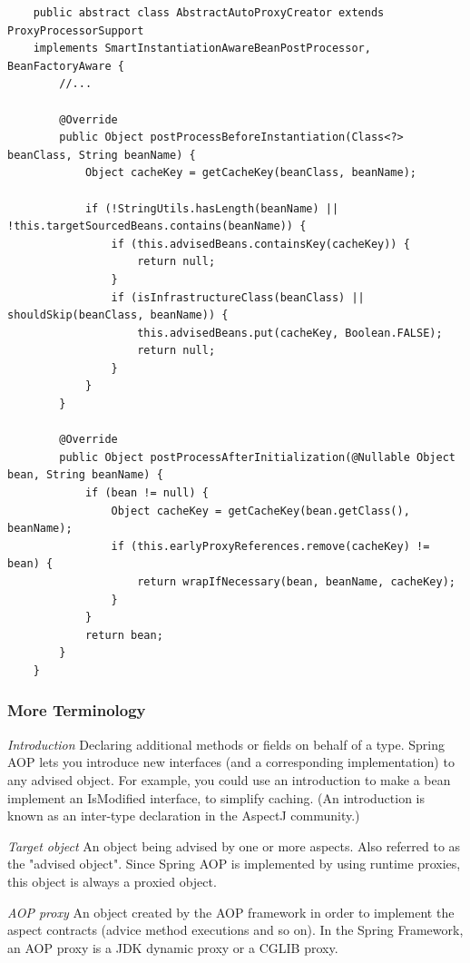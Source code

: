 \documentclass{scrartcl}
\begin{document}
\begin{lstlisting}
    public abstract class AbstractAutoProxyCreator extends ProxyProcessorSupport
    implements SmartInstantiationAwareBeanPostProcessor, BeanFactoryAware {
        //...

        @Override
        public Object postProcessBeforeInstantiation(Class<?> beanClass, String beanName) {
            Object cacheKey = getCacheKey(beanClass, beanName);

            if (!StringUtils.hasLength(beanName) || !this.targetSourcedBeans.contains(beanName)) {
                if (this.advisedBeans.containsKey(cacheKey)) {
                    return null;
                }
                if (isInfrastructureClass(beanClass) || shouldSkip(beanClass, beanName)) {
                    this.advisedBeans.put(cacheKey, Boolean.FALSE);
                    return null;
                }
            }
        }

        @Override
        public Object postProcessAfterInitialization(@Nullable Object bean, String beanName) {
            if (bean != null) {
                Object cacheKey = getCacheKey(bean.getClass(), beanName);
                if (this.earlyProxyReferences.remove(cacheKey) != bean) {
                    return wrapIfNecessary(bean, beanName, cacheKey);
                }
            }
            return bean;
        }
    }
\end{lstlisting}

\subsubsection{More Terminology}

\textit{Introduction}
Declaring additional methods or fields on behalf of a type. Spring AOP lets you introduce new interfaces (and a corresponding implementation) to any advised object. For example, you could use an introduction to make a bean implement an IsModified interface, to simplify caching. (An introduction is known as an inter-type declaration in the AspectJ community.)

\textit{Target object}
An object being advised by one or more aspects. Also referred to as the "advised object". Since Spring AOP is implemented by using runtime proxies, this object is always a proxied object.

\textit{AOP proxy}
An object created by the AOP framework in order to implement the aspect contracts (advice method executions and so on). In the Spring Framework, an AOP proxy is a JDK dynamic proxy or a CGLIB proxy.
\end{document}
